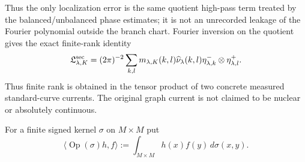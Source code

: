 \documentclass[11pt]{article}
\begin{document}
Thus the only localization error is the same quotient high-pass term treated
by the balanced/unbalanced phase estimates; it is not an unrecorded leakage
of the Fourier polynomial outside the branch chart.
Fourier inversion on the quotient gives the exact
finite-rank identity
\begin{equation}
\label{eq:section-current-finite-rank}
 \mathfrak L^{\rm sec}_{\lambda,K}
 =(2\pi)^{-2}\sum_{k,l}
 m_{\lambda,K}(k,l)\widehat\nu_\lambda(k,l)
 \eta^-_{\lambda,k}\otimes\eta^+_{\lambda,l}.
\end{equation}
Thus finite rank is obtained in the tensor product of two concrete measured
standard-curve currents.  The original graph current is not claimed to be
nuclear or absolutely continuous.

For a finite signed kernel $\sigma$ on $M\times M$ put
\begin{equation}
\label{eq:kernel-operator-identification}
 \langle\operatorname{Op}(\sigma)h,f\rangle
 :=\int_{M\times M}h(x)f(y)\,d\sigma(x,y).
\end{equation}
\end{document}
